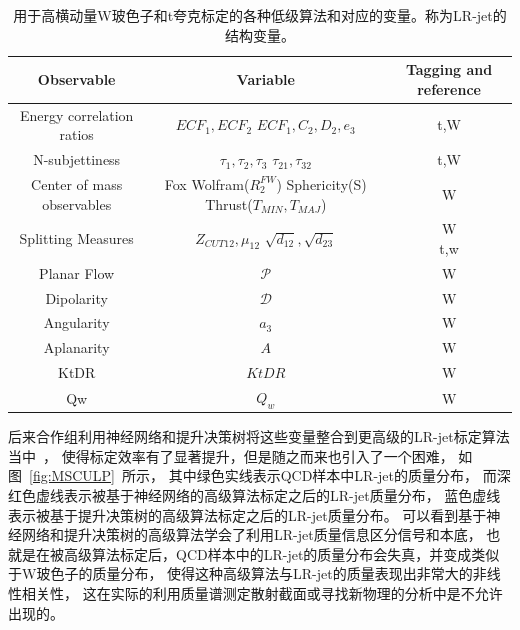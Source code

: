 \begin{table}[ht]
\caption{用于高横动量W玻色子和t夸克标定的各种低级算法和对应的变量。称为LR-jet的结构变量。}
\begin{center}
\begin{adjustbox}{width=\columnwidth,center}
\begin{tabular}{c|c|c}
    \hline
    \hline
    Observable & Variable & Tagging and reference \\
    \hline  
    Energy correlation ratios & \thead{$ECF_1,ECF_2$\\$ECF_1,C_2,D_2,e_3$} & t,W\cite{JSS1,JSS2} \\
    \hline  
    N-subjettiness & \thead{$\tau_1,\tau_2,\tau_3$\\$\tau_{21},\tau_{32}$} & t,W\cite{JSS3,JSS4} \\
    \hline  
    Center of mass observables & \thead{Fox Wolfram($R_2^{FW}$)\\Sphericity(S)\\Thrust($T_{MIN},T_{MAJ}$)} & W\cite{JSS5,JSS6,JSS7}  \\
    \hline  
    Splitting Measures & \thead{$Z_{CUT12},\mu_{12}$\\$\sqrt{d_{12}},\sqrt{d_{23}}$} & \thead{W\cite{JSS8,JSS9}\\t,w\cite{JSS10}} \\
    \hline  
    Planar Flow & $\mathcal{P}$& W\cite{JSS11} \\
    \hline  
    Dipolarity & $\mathcal{D}$ & W\cite{JSS12} \\
    \hline  
    Angularity & $a_3$ & W\cite{JSS13} \\
    \hline  
    Aplanarity & $A$ & W\cite{JSS6} \\
    \hline  
    KtDR & $KtDR$ & W\cite{JSS14} \\
    \hline  
    Qw & $Q_w$ & W\cite{JSS8} \\
    \hline
    \hline
\end{tabular}
\end{adjustbox}
\end{center}
\label{tab:JSS}
\end{table}


后来合作组利用神经网络和提升决策树将这些变量整合到更高级的LR-jet标定算法当中~\cite{ATL-PHYS-PUB-2017-004}，
使得标定效率有了显著提升，但是随之而来也引入了一个困难，
如图~\ref{fig:MSCULP}~所示，
其中绿色实线表示QCD样本中LR-jet的质量分布，
而深红色虚线表示被基于神经网络的高级算法标定之后的LR-jet质量分布，
蓝色虚线表示被基于提升决策树的高级算法标定之后的LR-jet质量分布。
可以看到基于神经网络和提升决策树的高级算法学会了利用LR-jet质量信息区分信号和本底，
也就是在被高级算法标定后，QCD样本中的LR-jet的质量分布会失真，并变成类似于W玻色子的质量分布，
使得这种高级算法与LR-jet的质量表现出非常大的非线性相关性，
这在实际的利用质量谱测定散射截面或寻找新物理的分析中是不允许出现的。

